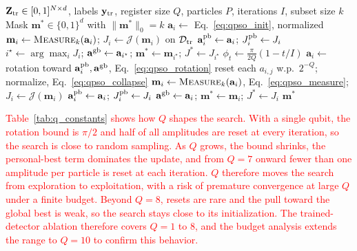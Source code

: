 \documentclass[conference]{IEEEtran}
\begin{document}
\begin{algorithm}[!t]
\caption{\textcolor{red}{Variable-qubit QPSO feature
selection. Steps commented with Q are the only ones that depend on
the register size.}}
\label{alg:qpso}
\color{red}
\small
\begin{algorithmic}[1]
\Require $\mathbf{Z}_{\rm tr}\in[0,1]^{N\times d}$, labels $\mathbf{y}_{\rm tr}$, register size $Q$, particles $P$, iterations $I$, subset size $k$
\Ensure Mask $\mathbf{m}^{*}\in\{0,1\}^{d}$ with $\|\mathbf{m}^{*}\|_0=k$
  \State $\mathbf{a}_i\gets$ Eq.~\eqref{eq:qpso_init}, normalized 
  \State $\mathbf{m}_i\gets\textsc{Measure}_k(\mathbf{a}_i)$; $J_i\gets\mathcal{J}(\mathbf{m}_i)$ on $\mathcal{D}_{\rm tr}$
  \State $\mathbf{a}_i^{\rm pb}\gets\mathbf{a}_i$; $J_i^{\rm pb}\gets J_i$
\EndFor
\State $i^{\star}\gets\arg\max_i J_i$; $\mathbf{a}^{\rm gb}\gets\mathbf{a}_{i^{\star}}$; $\mathbf{m}^{*}\gets\mathbf{m}_{i^{\star}}$; $J^{*}\gets J_{i^{\star}}$
  \State $\phi_t\gets\frac{\pi}{2Q}(1-t/I)$ 
    \State $\mathbf{a}_i\gets$ rotation toward $\mathbf{a}_i^{\rm pb},\mathbf{a}^{\rm gb}$, Eq.~\eqref{eq:qpso_rotation}
    \State reset each $a_{i,j}$ w.p.\ $2^{-Q}$; normalize, Eq.~\eqref{eq:qpso_collapse} 
    \State $\mathbf{m}_i\gets\textsc{Measure}_k(\mathbf{a}_i)$, Eq.~\eqref{eq:qpso_measure}; $J_i\gets\mathcal{J}(\mathbf{m}_i)$
      \State $\mathbf{a}_i^{\rm pb}\gets\mathbf{a}_i$; $J_i^{\rm pb}\gets J_i$
    \EndIf
      \State $\mathbf{a}^{\rm gb}\gets\mathbf{a}_i$; $\mathbf{m}^{*}\gets\mathbf{m}_i$; $J^{*}\gets J_i$
    \EndIf
  \EndFor
\EndFor
\State \Return $\mathbf{m}^{*}$ 
\end{algorithmic}
\end{algorithm}

\textcolor{red}{Table~\ref{tab:q_constants} shows
how $Q$ shapes the search. With a single qubit, the rotation bound is
$\pi/2$ and half of all amplitudes are reset at every iteration, so
the search is close to random sampling. As $Q$ grows, the bound
shrinks, the personal-best term dominates the update, and from $Q=7$
onward fewer than one amplitude per particle is reset at each
iteration. $Q$ therefore
moves the search from exploration to exploitation, with a risk of
premature convergence at large $Q$ under a finite budget. Beyond
$Q=8$, resets are rare and the pull toward the global best is weak,
so the search stays close to its initialization. The trained-detector
ablation therefore covers $Q=1$ to $8$, and the budget analysis
extends the range to $Q=10$ to confirm this behavior.}
\end{document}

